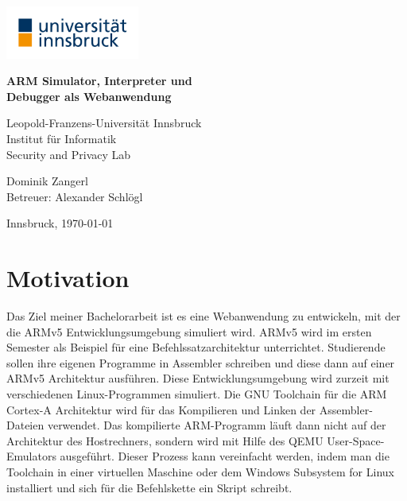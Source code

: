 \documentclass[a4paper, 11pt, onecolumn]{article}
\providecommand{\keywords}[1]
{
  \noindent \textbf{Schlüsselwörter } #1
}
\begin{document}
\renewcommand{\abstractname}{Kurzfassung}
    \begin{center}

        \includegraphics[width=0.33\textwidth]{data/uibk} 
        
		\LARGE
        \textbf{ARM Simulator, Interpreter und\\Debugger als Webanwendung\\}
        
		\vspace{0.2cm}        
            
        \large
        Leopold-Franzens-Universität Innsbruck\\
        Institut für Informatik\\
		Security and Privacy Lab
		
		\vspace{0.4cm}   
		
		\Large  
        Dominik Zangerl\\
		Betreuer: Alexander Schlögl  
                
        \vspace{0.4cm}
        
        \large    
        Innsbruck, \today
           
    \end{center}
    
%
%
%

\section{Motivation}

Das Ziel meiner Bachelorarbeit ist es eine Webanwendung zu entwickeln, mit der die ARMv5 Entwicklungsumgebung simuliert wird. ARMv5 \cite{arm:2005} wird im ersten Semester als Beispiel für eine Befehlssatzarchitektur unterrichtet. Studierende sollen ihre eigenen Programme in Assembler \cite{assembly} schreiben und diese dann auf einer ARMv5 Architektur ausführen. Diese Entwicklungsumgebung wird zurzeit mit verschiedenen Linux-Programmen simuliert. Die GNU Toolchain für die ARM Cortex-A Architektur \cite{gnutoolchain} wird für das Kompilieren und Linken der Assembler-Dateien verwendet. Das kompilierte ARM-Programm läuft dann nicht auf der Architektur des Hostrechners, sondern wird mit Hilfe des QEMU User-Space-Emulators \cite{qemu} ausgeführt. Dieser Prozess kann vereinfacht werden, indem man die Toolchain in einer virtuellen Maschine oder dem Windows Subsystem for Linux \cite{wsl} installiert und sich für die Befehlskette ein Skript schreibt.
\end{document}
